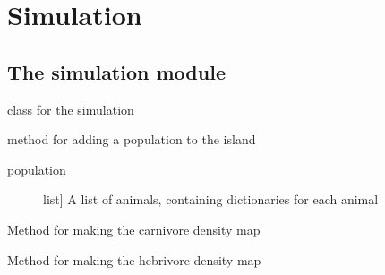 \documentclass[a4paper,10pt,english]{sphinxmanual}
\begin{document}
\chapter{Simulation}
\label{\detokenize{simulation:simulation}}\label{\detokenize{simulation::doc}}

\section{The simulation module}
\label{\detokenize{simulation:the-simulation-module}}\label{\detokenize{simulation:module-biosim.simulation}}

\begin{fulllineitems}
\label{\detokenize{simulation:biosim.simulation.BioSim}}
class for the simulation

\begin{fulllineitems}
\label{\detokenize{simulation:biosim.simulation.BioSim.add_population}}
method for adding a population to the island
\begin{description}
\item[{population}] \leavevmode{[}list{]}
A list of animals, containing dictionaries for each animal

\end{description}

\end{fulllineitems}


\begin{fulllineitems}
\label{\detokenize{simulation:biosim.simulation.BioSim.make_carnivore_density_map}}
Method for making the carnivore density map

\end{fulllineitems}


\begin{fulllineitems}
\label{\detokenize{simulation:biosim.simulation.BioSim.make_herbivore_density_map}}
Method for making the hebrivore density map


\end{fulllineitems}
\end{fulllineitems}
\end{document}
